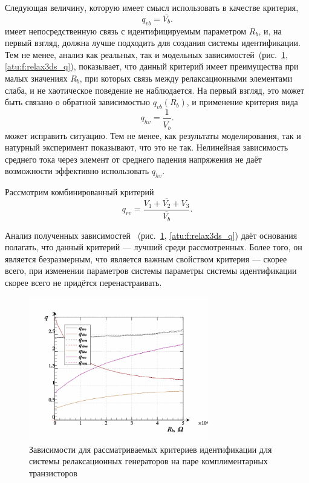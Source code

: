 Следующая величину, которую имеет смысл использовать в качестве критерия,
%
\begin{equation}
  q_{vb} = \overline{V_b} .
  \label{atu:eq:q_vb_relax}
\end{equation}
%
имеет непосредственную связь с идентифицируемым параметром $R_b$,
и, на первый взгляд, должна лучше подходить для
создания системы идентификации. Тем не менее,
анализ как реальных, так и модельных
зависимостей~(рис.~\ref{atu:f:relax3d_q}, \ref{atu:f:relax3ds_q}),
показывает, что данный критерий имеет преимущества при малых значениях $R_b$,
при которых связь между релаксационными элементами слаба,
и не хаотическое поведение не наблюдается. На первый взгляд,
это может быть связано о обратной зависимостью $q_{vb}(R_b)$,
и применение критерия вида
%
\begin{equation}
  q_{hv} = \frac{1}{\overline{V_b}} .
  \label{atu:eq:q_hb_relax}
\end{equation}
может исправить ситуацию. Тем не менее,
как результаты моделирования, так и натурный эксперимент
показывают, что это не так. Нелинейная
зависимость среднего тока через элемент
от среднего падения напряжения не даёт возможности
эффективно использовать $q_{hv}$.

Рассмотрим комбинированный критерий
\[
  q_{rv} = \frac{\overline{V_1+V_2+V_3}}{\overline{V_b}}.
\]

Анализ полученных зависимостей ~(рис.~\ref{atu:f:relax3d_q}, \ref{atu:f:relax3ds_q})
даёт основания полагать, что данный критерий --- лучший среди рассмотренных.
Более того, он является безразмерным, что является важным свойством критерия ---
скорее всего, при изменении параметров системы параметры системы
идентификации скорее всего не придётся перенастраивать.

\begin{figure}[htb!]
  \centerline{\includegraphics[width=0.7\textwidth]{p/relax3d_read_q-p_q1.png} }
  \caption{Зависимости для рассматриваемых критериев идентификации для системы релаксационных генераторов на паре комплиментарных транзисторов}
  \label{atu:f:relax3d_q}
\end{figure}

